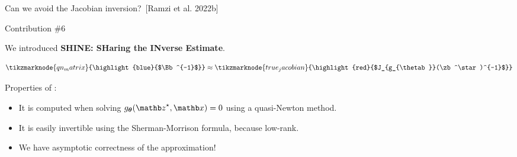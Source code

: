 \begin{frame}{Can we avoid the Jacobian inversion?~[Ramzi et al. 2022b]}
    \begin{exampleblock}{Contribution \#6}
    \end{exampleblock}

    We introduced \textbf{SHINE: SHaring the INverse Estimate}.

    \begin{equation*}
        \tikzmarknode{qn_matrix}{\highlight{blue}{$\Bb^{-1}$}} \approx \tikzmarknode{true_jacobian}{\highlight{red}{$J_{g_{\thetab}}(\zb^\star)^{-1}$}}
    \end{equation*}

    \pause

    \hfill \break
    \begin{overprint}
        Properties of :
    \begin{itemize}
        \item<4-> It is computed when solving $g_\thetab(\zb^\star, \xb) = 0$ using a quasi-Newton method.
        \item<5-> It is easily invertible using the Sherman-Morrison formula, because low-rank.
    \end{itemize}


    \begin{itemize}
        \item We have asymptotic correctness of the approximation!
    \end{itemize}
    \end{overprint}


\end{frame}


